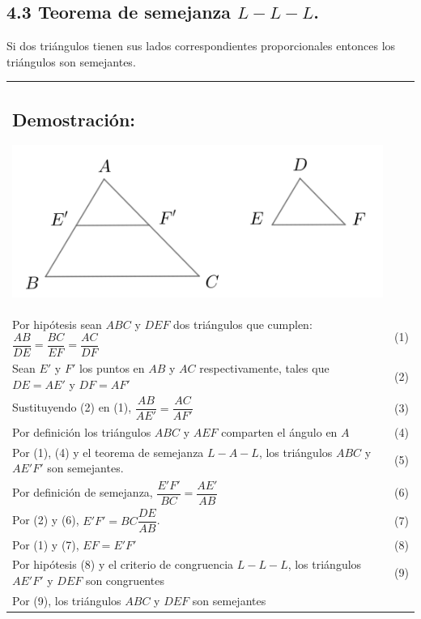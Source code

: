 \documentclass[12pt,a4paper]{article}
\begin{document}
\subsection*{4.3 Teorema de semejanza $L-L-L$.}
Si dos triángulos tienen sus lados correspondientes proporcionales entonces los triángulos son semejantes.\\
\begin{tabular}{p{15.9cm}p{1cm}}
\subsection*{Demostración:}
\begin{center}
\includegraphics[scale=0.75]{semejanza.png} 
\end{center} 
\\Por hipótesis sean $ABC$ y $DEF$ dos triángulos que cumplen: $\dfrac{AB}{DE}=\dfrac{BC}{EF}=\dfrac{AC}{DF}$ & (1)
\\Sean $E'$ y $F'$ los puntos en $AB$ y $AC$ respectivamente, tales que $DE = AE'$ y $DF= AF'$ &(2)
\\Sustituyendo (2) en (1), $\dfrac{AB}{AE'}=\dfrac{AC}{AF'}$&(3)
\\ Por definición los triángulos $ABC$ y $AEF$ comparten el ángulo en $A$ &(4)
\\Por (1), (4) y el teorema de semejanza $L-A-L$, los triángulos $ABC$ y $AE'F'$ son semejantes. &(5)
\\Por definición de semejanza, $\dfrac{E'F'}{BC}=\dfrac{AE'}{AB}$ &(6)
\\Por (2) y (6), $E'F'=BC\dfrac{DE}{AB}$. & (7)
\\Por (1) y (7), $EF=E'F'$ & (8)
\\Por hipótesis (8) y el criterio de congruencia $L-L-L$, los triángulos $AE'F'$ y $DEF$ son congruentes &\medskip(9)
\\Por (9), los triángulos $ABC$ y $DEF$ son semejantes
\end{tabular}
\end{document}
